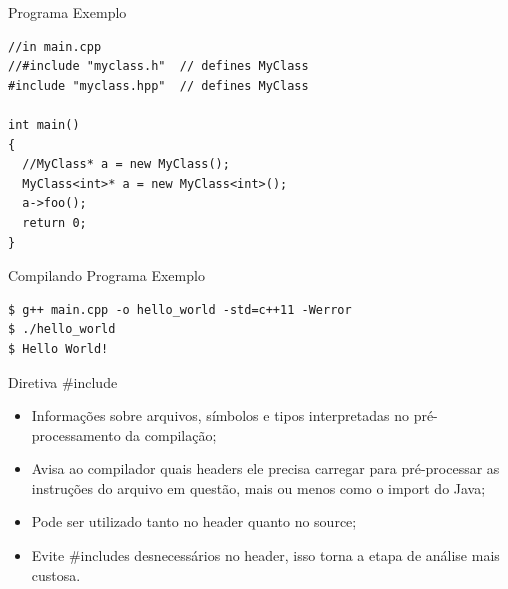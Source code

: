 \documentclass[12pt,table,xcolor={dvipsnames}]{beamer}
\begin{document}
\begin{frame}[fragile]{Programa Exemplo}
\begin{lstlisting}
//in main.cpp
//#include "myclass.h"  // defines MyClass
#include "myclass.hpp"  // defines MyClass

int main()
{
  //MyClass* a = new MyClass(); 
  MyClass<int>* a = new MyClass<int>();
  a->foo();
  return 0;
}
\end{lstlisting}
\end{frame}

\begin{frame}[fragile]{Compilando Programa Exemplo}
\begin{lstlisting}
$ g++ main.cpp -o hello_world -std=c++11 -Werror 
$ ./hello_world 
$ Hello World!
\end{lstlisting}
\end{frame}


\begin{frame}[fragile]{Diretiva \#include}
\begin{itemize}
\item Informações sobre arquivos, símbolos e tipos interpretadas no pré-processamento da compilação;
\item Avisa ao compilador quais headers ele precisa carregar para pré-processar as instruções do arquivo em questão, mais ou menos como o import do Java;
\item Pode ser utilizado tanto no header quanto no source;
\item Evite \#includes desnecessários no header, isso torna a etapa de análise mais custosa.
\end{itemize}
\end{frame}
\end{document}

